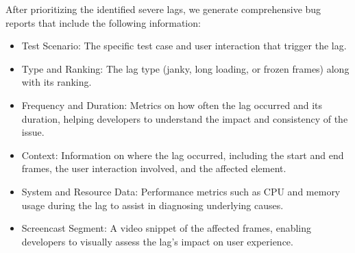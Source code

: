 

After prioritizing the identified severe lags, we generate comprehensive bug reports that include the following information:
\begin{itemize}
    \item Test Scenario: The specific test case and user interaction that trigger the lag.
    \item Type and Ranking: The lag type (janky, long loading, or frozen frames) along with its ranking.
    \item Frequency and Duration: Metrics on how often the lag occurred and its duration, helping developers to understand the impact and consistency of the issue.
    \item Context: Information on where the lag occurred, including the start and end frames, the user interaction involved, and the affected element.
    \item System and Resource Data: Performance metrics such as CPU and memory usage during the lag to assist in diagnosing underlying causes.
    \item Screencast Segment: A video snippet of the affected frames, enabling developers to visually assess the lag's impact on user experience.
\end{itemize}


